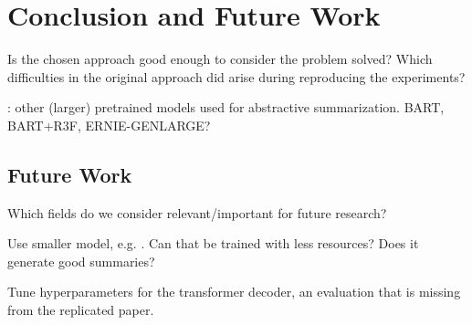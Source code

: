 \section{Conclusion and Future Work} %

Is the chosen approach good enough to consider the problem solved?
Which difficulties in the original approach did arise during reproducing the experiments?


\citeauthor{???}: other (larger) pretrained models used for abstractive summarization.
BART, BART+R3F, ERNIE-GENLARGE?




\subsection{Future Work}

Which fields do we consider relevant/important for future research?

Use smaller \Bert model, e.g. \BertTiny. Can that be trained with less resources? Does it generate good summaries?

Tune hyperparameters for the transformer decoder, an evaluation that is missing from the replicated paper.
